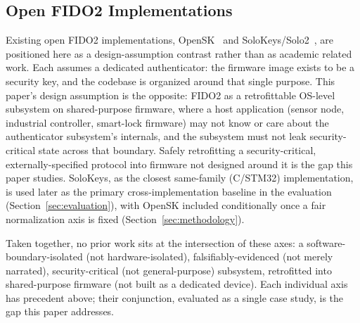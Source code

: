 \subsection{Open FIDO2 Implementations}
\label{subsec:related-opensource}

Existing open FIDO2 implementations, OpenSK~\cite{opensk} and SoloKeys/Solo2~\cite{solokeys}, are positioned here as a design-assumption contrast rather than as academic related work. Each assumes a dedicated authenticator: the firmware image exists to be a security key, and the codebase is organized around that single purpose. This paper's design assumption is the opposite: FIDO2 as a retrofittable OS-level subsystem on shared-purpose firmware, where a host application (sensor node, industrial controller, smart-lock firmware) may not know or care about the authenticator subsystem's internals, and the subsystem must not leak security-critical state across that boundary. Safely retrofitting a security-critical, externally-specified protocol into firmware not designed around it is the gap this paper studies. SoloKeys, as the closest same-family (C/STM32) implementation, is used later as the primary cross-implementation baseline in the evaluation (Section~\ref{sec:evaluation}), with OpenSK included conditionally once a fair normalization axis is fixed (Section~\ref{sec:methodology}).

Taken together, no prior work sits at the intersection of these axes: a software-boundary-isolated (not hardware-isolated), falsifiably-evidenced (not merely narrated), security-critical (not general-purpose) subsystem, retrofitted into shared-purpose firmware (not built as a dedicated device). Each individual axis has precedent above; their conjunction, evaluated as a single case study, is the gap this paper addresses.

